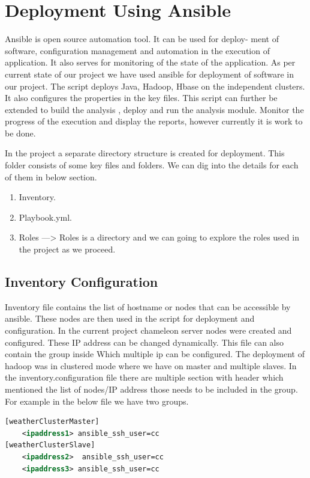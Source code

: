 \documentclass[9pt,twocolumn,twoside]{../../styles/osajnl}
\begin{document}
\section{Deployment Using Ansible}

Ansible is open source automation tool. It can be used for deploy- ment of software, configuration management and automation in the execution of application. 
It also serves for monitoring of the state of the application. As per current state of our project we have used ansible for deployment of software in our project. 
The script deploys Java, Hadoop, Hbase on the independent clusters. It also configures the properties in the key files. This script can further be extended to
build the analysis , deploy and run the analysis module. Monitor the progress of the execution and display the reports, however currently it is work to be done. 

In the project a separate directory structure is created for deployment.
This folder consists of some key files and folders. We can dig into the details for each of them in below section.

\begin{enumerate}
\item Inventory.
\item Playbook.yml.
\item Roles —> Roles is a directory and we can going to explore the roles used in the project as we proceed.
\end{enumerate}

\subsection{Inventory Configuration}


Inventory file contains the list of hostname or nodes that can be accessible by ansible. These nodes are then used in the script for deployment and configuration. 
In the current project chameleon server nodes were created and configured.
These IP address can be changed dynamically. This file can also contain the group inside Which multiple ip can be configured. The deployment of hadoop was in 
clustered mode where we have on master and multiple slaves. In the inventory.configuration file there are multiple section with header which mentioned the list
of nodes/IP address those needs to be included in the group. For example in the below file we have two groups.

\begin{lstlisting}[language=xml,caption=Inventory,breaklines=true]
[weatherClusterMaster]
    <ipaddress1> ansible_ssh_user=cc
[weatherClusterSlave]
    <ipaddress2>  ansible_ssh_user=cc
    <ipaddress3> ansible_ssh_user=cc
\end{lstlisting}
\end{document}
